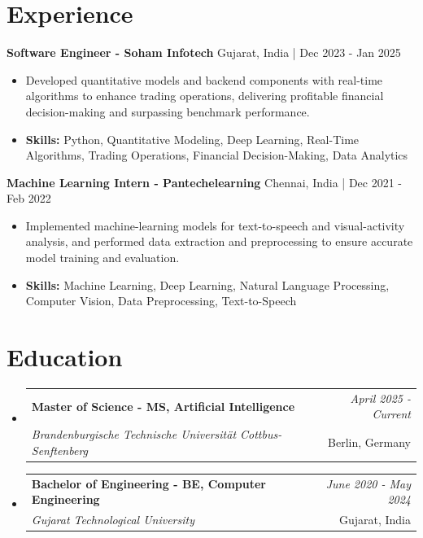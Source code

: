 \documentclass[a4paper,11pt]{article}
\makeatletter
\newcommand{\resumeSubheading}[4]{
\vspace{0.5mm}\item
    \begin{tabular*}{\linewidth}[t]{l@{\extracolsep{\fill}}r}
        \textbf{#1} & \textit{\footnotesize{#4}} \\
        \textit{\footnotesize{#3}} &  \footnotesize{#2}\\
    \end{tabular*}
    \vspace{-2.4mm}
}
\makeatother
\begin{document}
\section{\textbf{Experience}}


\vspace{1mm}
  \textbf{Software Engineer - Soham Infotech} \hfill Gujarat, India | Dec 2023 - Jan 2025
\vspace{-1.5mm} %
\begin{itemize}
  \item Developed quantitative models and backend components with real-time algorithms to enhance trading operations, delivering profitable financial decision-making and surpassing benchmark performance.

\vspace{-2mm}
  \item \textbf{Skills:} Python, Quantitative Modeling, Deep Learning, Real-Time Algorithms, Trading Operations, Financial Decision-Making, Data Analytics
\end{itemize}

\vspace{1mm}
  \textbf{Machine Learning Intern - Pantechelearning} \hfill Chennai, India | Dec 2021 - Feb 2022
\vspace{-1.5mm} %
\begin{itemize}
  \item Implemented machine-learning models for text-to-speech and visual-activity analysis, and performed data extraction and preprocessing to ensure accurate model training and evaluation.
\vspace{-2mm}
  \item \textbf{Skills:} Machine Learning, Deep Learning, Natural Language Processing, Computer Vision, Data Preprocessing, Text-to-Speech
\end{itemize}\section{\textbf{Education}}
\vspace{-0.4mm}

\begin{itemize}[leftmargin=0.15in, label={}]
\resumeSubheading
{Master of Science - MS, Artificial Intelligence }{Berlin, Germany}
{Brandenburgische Technische Universität Cottbus-Senftenberg  }{April 2025 - Current}

\vspace{1.0mm} %
\resumeSubheading
{Bachelor of Engineering - BE, Computer Engineering  }{Gujarat, India}
{Gujarat Technological University }{June 2020 - May 2024}

\end{itemize}
\end{document}
